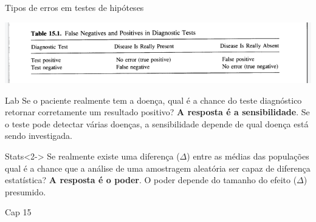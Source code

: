 \documentclass{beamer}
\begin{document}
\begin{frame}{\scriptsize Tipos de erros em testes de hipóteses}
  \begin{center}
    \includegraphics[width=.8\textwidth]{Cap10-11/tab15_1-falses_diag}

    \begin{block}{\scriptsize Lab}
      \tiny
      Se o paciente realmente tem a doença, qual é a chance do teste diagnóstico retornar corretamente um resultado positivo?
      {\bf A resposta é a sensibilidade}.
      Se o teste pode detectar várias doenças, a sensibilidade depende de \alert{qual doença} está sendo investigada.
    \end{block}
    \begin{block}{\scriptsize Stats}<2->
      \tiny
      Se realmente existe uma diferença ($\Delta$) entre as médias das populações qual é a chance que a análise de uma amostragem aleatória ser capaz de diferença estatística?
      {\bf A resposta é o poder}.
      O poder depende do \alert{tamanho do efeito} ($\Delta$) presumido.
    \end{block}
    \bigskip
  \end{center}

  \vfill
  \hfill \tiny Cap 15
\end{frame}
\end{document}

